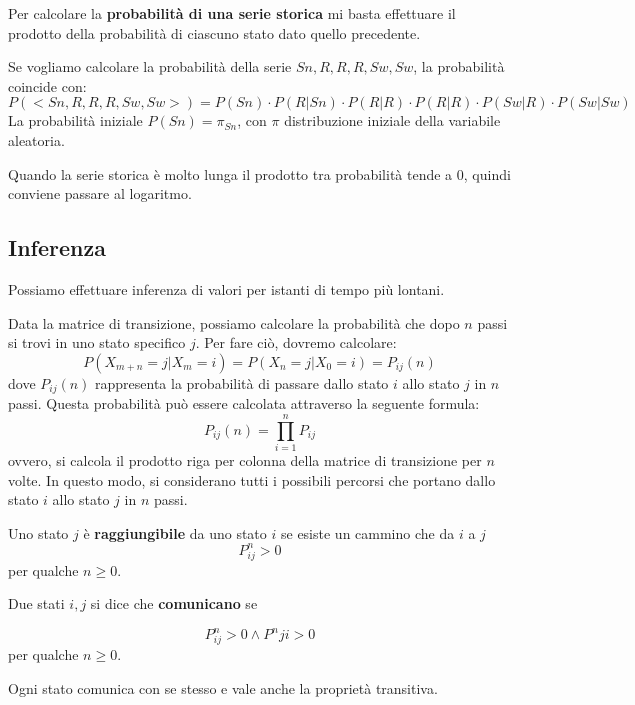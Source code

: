 Per calcolare la \textbf{probabilità di una serie storica} mi basta effettuare
il prodotto della probabilità di ciascuno stato dato quello precedente.
\begin{esempio}
    Se vogliamo calcolare la probabilità della serie $Sn, R,R,R,Sw,Sw$, la
    probabilità coincide con:
    \begin{equation*}
        P(<Sn, R,R,R,Sw,Sw>) = P(Sn) \cdot P(R|Sn) \cdot P(R|R)\cdot P(R|R)\cdot P(Sw|R) \cdot P(Sw|Sw)
    \end{equation*}
    La probabilità iniziale $P(Sn) = \pi_{Sn}$, con $\pi$ distribuzione iniziale
    della variabile aleatoria.
\end{esempio}
Quando la serie storica è molto lunga il prodotto tra probabilità tende a $0$, 
quindi conviene passare al logaritmo.
\subsection{Inferenza}
Possiamo effettuare inferenza di valori per istanti di tempo più lontani.

Data la matrice di transizione, possiamo calcolare la probabilità che dopo $n$
passi si trovi in uno stato specifico $j$. Per fare ciò, dovremo calcolare:
\begin{equation}
    P(X_{m + n} = j | X_{m} = i) = P(X_n = j | X_0 = i)=P_{ij}(n)
\end{equation} 
dove $P_{ij}(n)$ rappresenta la probabilità di passare dallo stato $i$ allo stato
$j$ in $n$ passi. Questa probabilità può essere calcolata attraverso la seguente
formula:
\begin{equation}
    P_{ij}(n) = \prod_{i = 1}^{n} P_{ij}
\end{equation}
ovvero, si calcola il prodotto riga per colonna della matrice di transizione
per $n$ volte. In questo modo, si considerano tutti i possibili percorsi che
portano dallo stato $i$ allo stato $j$ in $n$ passi.


\begin{definizione}
    Uno stato $j$ è \textbf{raggiungibile} da uno stato $i$ se esiste un cammino che da $i$ 
    a $j$ 
    $$P^n_{ij}>0$$ 
    per qualche $n\ge 0$.
\end{definizione}

\begin{definizione}
    Due stati $i,j$ si dice che \textbf{comunicano} se 
    
    $$P^n_{ij}>0 \land P^n{ji}>0$$ 
    per qualche $n\ge 0$.
\end{definizione}
\begin{nota}
    Ogni stato comunica con se stesso e vale anche la proprietà transitiva.
\end{nota}

